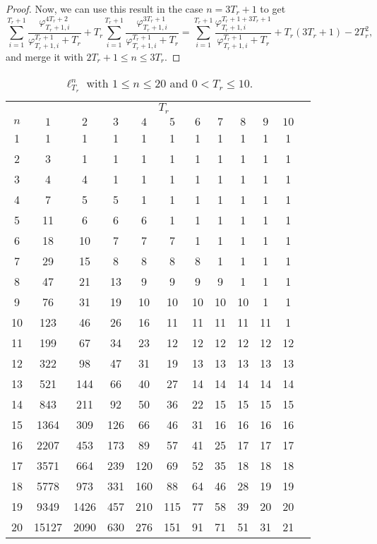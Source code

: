 \documentclass{article}
\begin{document}
\begin{proof}
    Now, we can use this result in the case $n = 3T_r + 1$ to get
    \begin{equation}
      \sum_{i=1}^{T_r + 1} \frac{\varphi_{T_r + 1, i}^{4T_r + 2}}
          {\varphi_{T_r + 1, i}^{T_r + 1} + T_r} + T_r \sum_{i=1}^{T_r + 1} \frac{\varphi_{T_r + 1, i}^{3T_r + 1}}
          {\varphi_{T_r + 1, i}^{T_r + 1} + T_r} = \sum_{i=1}^{T_r + 1} \frac{\varphi_{T_r + 1, i}^{T_r + 1 + 3T_r + 1}}
          {\varphi_{T_r + 1, i}^{T_r + 1} + T_r} + T_r (3T_r + 1) - 2T_r ^2,
    \end{equation}
    and merge it with $2T_r + 1 \leq n \leq 3T_r$.
  \end{proof}

  \begin{table}[!ht]
    \centering
    \begin{tabular}{*{12}{c}}
      \toprule
      & \multicolumn{10}{c}{$T_r$} \\
      $n$ & $1$ & $2$ & $3$ & $4$ & $5$ & $6$ & $7$ & $8$ & $9$ & $10$ \\
      \midrule
      1 & 1 & 1 & 1 & 1 & 1 & 1 & 1 & 1 & 1 & 1 \\
      2 & 3 & 1 & 1 & 1 & 1 & 1 & 1 & 1 & 1 & 1 \\
      3 & 4 & 4 & 1 & 1 & 1 & 1 & 1 & 1 & 1 & 1 \\
      4 & 7 & 5 & 5 & 1 & 1 & 1 & 1 & 1 & 1 & 1 \\
      5 & 11 & 6 & 6 & 6 & 1 & 1 & 1 & 1 & 1 & 1 \\
      6 & 18 & 10 & 7 & 7 & 7 & 1 & 1 & 1 & 1 & 1 \\
      7 & 29 & 15 & 8 & 8 & 8 & 8 & 1 & 1 & 1 & 1 \\
      8 & 47 & 21 & 13 & 9 & 9 & 9 & 9 & 1 & 1 & 1 \\
      9 & 76 & 31 & 19 & 10 & 10 & 10 & 10 & 10 & 1 & 1 \\
      10 & 123 & 46 & 26 & 16 & 11 & 11 & 11 & 11 & 11 & 1 \\
      11 & 199 & 67 & 34 & 23 & 12 & 12 & 12 & 12 & 12 & 12 \\
      12 & 322 & 98 & 47 & 31 & 19 & 13 & 13 & 13 & 13 & 13 \\
      13 & 521 & 144 & 66 & 40 & 27 & 14 & 14 & 14 & 14 & 14 \\
      14 & 843 & 211 & 92 & 50 & 36 & 22 & 15 & 15 & 15 & 15 \\
      15 & 1364 & 309 & 126 & 66 & 46 & 31 & 16 & 16 & 16 & 16 \\
      16 & 2207 & 453 & 173 & 89 & 57 & 41 & 25 & 17 & 17 & 17 \\
      17 & 3571 & 664 & 239 & 120 & 69 & 52 & 35 & 18 & 18 & 18 \\
      18 & 5778 & 973 & 331 & 160 & 88 & 64 & 46 & 28 & 19 & 19 \\
      19 & 9349 & 1426 & 457 & 210 & 115 & 77 & 58 & 39 & 20 & 20 \\
      20 & 15127 & 2090 & 630 & 276 & 151 & 91 & 71 & 51 & 31 & 21 \\
      \bottomrule
    \end{tabular}
    \caption{$\ell_{T_r}^{n}$ with $1 \leq n \leq 20$ and $0 < T_r \leq 10$.}
    \label{tab:lnTr}
  \end{table}
\end{document}
